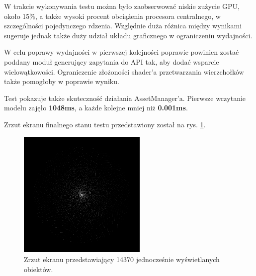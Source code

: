 W trakcie wykonywania testu można było zaobserwować niskie zużycie GPU, około 15\%, a także wysoki procent obciążenia procesora centralnego, w szczególności pojedynczego rdzenia. Względnie duża różnica między wynikami sugeruje jednak także duży udział układu graficznego w ograniczeniu wydajności. 

W celu poprawy wydajności w pierwszej kolejności poprawie powinien zostać poddany moduł generujący zapytania do API tak, aby dodać wsparcie wielowątkowości. Ograniczenie złożoności shader'a przetwarzania wierzchołków także pomogłoby w poprawie wyniku.

Test pokazuje także skuteczność działania AssetManager'a. Pierwsze wczytanie modelu zajęło \textbf{1048ms}, a każde kolejne mniej niż \textbf{0.001ms}.

Zrzut ekranu finalnego stanu testu przedstawiony został na rys. \ref{demo_test_objects}.

\begin{figure}[h!]
	\centering
	\includegraphics[width=0.55\textwidth]{images/demo_test_objects.png}
	\caption{Zrzut ekranu przedstawiający 14370 jednocześnie wyświetlanych obiektów.}
	\label{demo_test_objects}
\end{figure}

